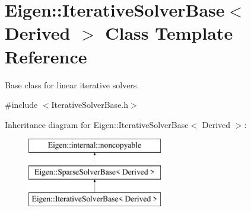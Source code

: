 \hypertarget{class_eigen_1_1_iterative_solver_base}{}\section{Eigen\+::Iterative\+Solver\+Base$<$ Derived $>$ Class Template Reference}
\label{class_eigen_1_1_iterative_solver_base}


Base class for linear iterative solvers.  




{\ttfamily \#include $<$Iterative\+Solver\+Base.\+h$>$}

Inheritance diagram for Eigen\+::Iterative\+Solver\+Base$<$ Derived $>$\+:\begin{figure}[H]
\begin{center}
\leavevmode
\includegraphics[height=3.000000cm]{class_eigen_1_1_iterative_solver_base}
\end{center}
\end{figure}
